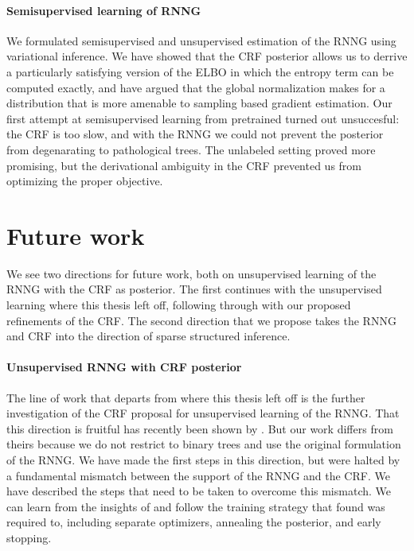  \paragraph{Semisupervised learning of RNNG}
    We formulated semisupervised and unsupervised estimation of the RNNG using variational inference. We have showed that the CRF posterior allows us to derrive a particularly satisfying version of the ELBO in which the entropy term can be computed exactly, and have argued that the global normalization makes for a distribution that is more amenable to sampling based gradient estimation. Our first attempt at semisupervised learning from pretrained turned out unsuccesful: the CRF is too slow, and with the RNNG we could not prevent the posterior from degenarating to pathological trees. The unlabeled setting proved more promising, but the derivational ambiguity in the CRF prevented us from optimizing the proper objective.

\section{Future work}
  We see two directions for future work, both on unsupervised learning of the RNNG with the CRF as posterior. The first continues with the unsupervised learning where this thesis left off, following through with our proposed refinements of the CRF. The second direction that we propose takes the RNNG and CRF into the direction of sparse structured inference.

  \paragraph{Unsupervised RNNG with CRF posterior}
    The line of work that departs from where this thesis left off is the further investigation of the CRF proposal for unsupervised learning of the RNNG. That this direction is fruitful has recently been shown by \citet{kim2019unsupervised}. But our work differs from theirs because we do not restrict to binary trees and use the original formulation of the RNNG. We have made the first steps in this direction, but were halted by a fundamental mismatch between the support of the RNNG and the CRF. We have described the steps that need to be taken to overcome this mismatch. We can learn from the insights of \cite{kim2019unsupervised} and follow the training strategy that found was required to, including separate optimizers, annealing the posterior, and early stopping.

